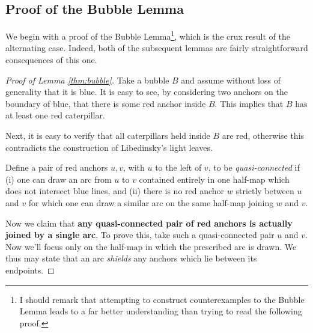 \subsection{Proof of the Bubble Lemma}
We begin with a proof of the Bubble Lemma\footnote{I should remark that attempting to construct counterexamples to the Bubble Lemma leads to a far better understanding than trying to read the following proof.}, which is the crux result of the alternating case.  Indeed, both of the subsequent lemmas are fairly straightforward consequences of this one.  

\begin{proof}[Proof of Lemma \ref{thm:bubble}]
	Take a bubble $B$ and assume without loss of generality that it is blue.  It is easy to see, by considering two anchors on the boundary of blue, that there is some red anchor inside $B$.  This implies that $B$ has at least one red caterpillar.

	Next, it is easy to verify that all caterpillars held inside $B$ are red, otherwise this contradicts the construction of Libedinsky's light leaves.

	Define a pair of red anchors $u, v$, with $u$ to the left of $v$, to be \emph{quasi-connected} if (i) one can draw an arc from $u$ to $v$ contained entirely in one half-map which does not intersect blue lines, and (ii) there is no red anchor $w$ strictly between $u$ and $v$ for which one can draw a similar arc on the same half-map joining $w$ and $v$.

	Now we claim that \textbf{any quasi-connected pair of red anchors is actually joined by a single arc}.  To prove this, take such a quasi-connected pair $u$ and $v$.  Now we'll focus only on the half-map in which the prescribed arc is drawn.  We thus may state that an arc \emph{shields} any anchors which lie between its endpoints.
	

\end{proof}
